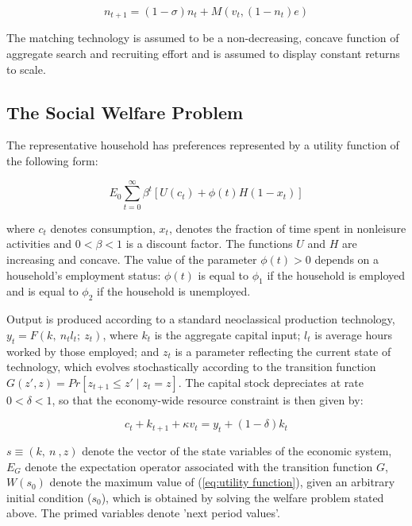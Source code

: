 \documentclass[english]{article}
\begin{document}
\begin{equation}
n_{t+1}=(1-\sigma)n_{t}+M(v_{t},(1-n_{t})e)\label{eq:dynamic of n}
\end{equation}


The matching technology is assumed to be a non-decreasing, concave
function of aggregate search and recruiting effort and is assumed
to display constant returns to scale.


\subsection{The Social Welfare Problem}

The representative household has preferences represented by a utility
function of the following form:

\begin{equation}
E_{0}\sum_{t=0}^{\infty}\beta^{t}\left[U(c_{t})+\phi(t)H(1-x_{t})\right]\label{eq:utility function}
\end{equation}


where $c_{t}$ denotes consumption, $x_{t}$, denotes the fraction
of time spent in nonleisure activities and $0<\beta<1$ is a discount
factor. The functions $U$ and $H$ are increasing and concave. The
value of the parameter $\phi(t)>0$ depends on a household's employment
status: $\phi(t)$ is equal to $\phi_{1}$ if the household is employed
and is equal to $\phi_{2}$ if the household is unemployed.

Output is produced according to a standard neoclassical production
technology, $y_{t}=F(k,\: n_{t}l_{t};\: z_{t})$, where $k_{t}$ is
the aggregate capital input; $l_{t}$ is average hours worked by those
employed; and $z_{t}$ is a parameter reflecting the current state
of technology, which evolves stochastically according to the transition
function $G(z',z)=Pr[z_{t+1}\leq z'\mid z_{t}=z]$. The capital stock
depreciates at rate $0<\delta<1$, so that the economy-wide resource
constraint is then given by:

\begin{equation}
c_{t}+k_{t+1}+\kappa v_{t}=y_{t}+(1-\delta)k_{t}\label{eq:budget constraint}
\end{equation}


$s\equiv(k,\: n\:,z)$ denote the vector of the state variables of
the economic system, $E_{G}$ denote the expectation operator associated
with the transition function $G$, $W(s_{0})$ denote the maximum
value of (\ref{eq:utility function}), given an arbitrary initial
condition ($s_{0}$), which is obtained by solving the welfare problem
stated above. The primed variables denote 'next period values'.
\end{document}
